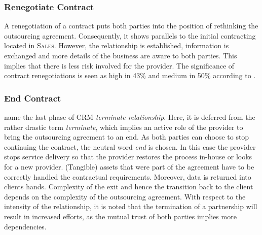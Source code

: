 	\subsubsection{Renegotiate Contract}
	A renegotiation of a contract puts both parties into the position of rethinking the outsourcing agreement. Consequently, it shows parallels to the initial contracting located in \textsc{Sales}. However, the relationship is established, information is exchanged and more details of the business are aware to both parties. This implies that there is less risk involved for the provider. The significance of contract renegotiations is seen as high in 43\% and medium in 50\% according to \cite{itgov2005}. 
	
	
	\subsubsection{End Contract}
	\cite{reinartz2004customer} name the last phase of \acrshort{CRM} \textit{terminate relationship}. Here, it is deferred from the rather drastic term \textit{terminate}, which implies an active role of the provider to bring the outsourcing agreement to an end. As both parties can choose to stop continuing the contract, the neutral word \textit{end} is chosen. In this case the provider stops service delivery so that the provider restores the process in-house or looks for a new provider. (Tangible) assets that were part of the agreement have to be correctly handled \wrt the contractual requirements. Moreover, data is returned into clients hands. Complexity of the exit and hence the transition back to the client depends on the complexity of the outsourcing agreement. With respect to the intensity of the relationship, it is noted that the termination of a partnership will result in increased efforts, as the mutual trust of both parties implies more dependencies. 
	
